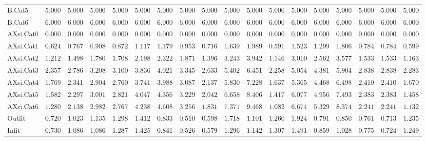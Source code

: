 \documentclass[6pt]{article}
\begin{document}
{\begin{longtable}{lrrrrrrrrrrrrrrrrr}
B.Cat5&$ 5.000$&$ 5.000$&$ 5.000$&$ 5.000$&$ 5.000$&$ 5.000$&$ 5.000$&$ 5.000$&$ 5.000$&$ 5.000$&$ 5.000$&$ 5.000$&$ 5.000$&$ 5.000$&$ 5.000$&$ 5.000$&$ 5.000$\tabularnewline
B.Cat6&$ 6.000$&$ 6.000$&$ 6.000$&$ 6.000$&$ 6.000$&$ 6.000$&$ 6.000$&$ 6.000$&$ 6.000$&$ 6.000$&$ 6.000$&$ 6.000$&$ 6.000$&$ 6.000$&$ 6.000$&$ 6.000$&$ 6.000$\tabularnewline
AXsi.Cat0&$ 0.000$&$ 0.000$&$ 0.000$&$ 0.000$&$ 0.000$&$ 0.000$&$ 0.000$&$ 0.000$&$ 0.000$&$ 0.000$&$ 0.000$&$ 0.000$&$ 0.000$&$ 0.000$&$ 0.000$&$ 0.000$&$ 0.000$\tabularnewline
AXsi.Cat1&$ 0.624$&$ 0.767$&$ 0.908$&$ 0.872$&$ 1.117$&$ 1.179$&$ 0.953$&$ 0.716$&$ 1.639$&$ 1.989$&$ 0.591$&$ 1.523$&$ 1.299$&$ 1.806$&$ 0.784$&$ 0.784$&$ 0.599$\tabularnewline
AXsi.Cat2&$ 1.212$&$ 1.498$&$ 1.780$&$ 1.708$&$ 2.198$&$ 2.322$&$ 1.871$&$ 1.396$&$ 3.243$&$ 3.942$&$ 1.146$&$ 3.010$&$ 2.562$&$ 3.577$&$ 1.533$&$ 1.533$&$ 1.163$\tabularnewline
AXsi.Cat3&$ 2.357$&$ 2.786$&$ 3.208$&$ 3.100$&$ 3.836$&$ 4.021$&$ 3.345$&$ 2.633$&$ 5.402$&$ 6.451$&$ 2.258$&$ 5.054$&$ 4.381$&$ 5.904$&$ 2.838$&$ 2.838$&$ 2.283$\tabularnewline
AXsi.Cat4&$ 1.769$&$ 2.341$&$ 2.904$&$ 2.760$&$ 3.741$&$ 3.988$&$ 3.087$&$ 2.137$&$ 5.830$&$ 7.228$&$ 1.637$&$ 5.365$&$ 4.468$&$ 6.498$&$ 2.410$&$ 2.410$&$ 1.670$\tabularnewline
AXsi.Cat5&$ 1.582$&$ 2.297$&$ 3.001$&$ 2.821$&$ 4.047$&$ 4.356$&$ 3.229$&$ 2.042$&$ 6.658$&$ 8.406$&$ 1.417$&$ 6.077$&$ 4.956$&$ 7.493$&$ 2.383$&$ 2.383$&$ 1.458$\tabularnewline
AXsi.Cat6&$ 1.280$&$ 2.138$&$ 2.982$&$ 2.767$&$ 4.238$&$ 4.608$&$ 3.256$&$ 1.831$&$ 7.371$&$ 9.468$&$ 1.082$&$ 6.674$&$ 5.329$&$ 8.374$&$ 2.241$&$ 2.241$&$ 1.132$\tabularnewline
Outfit&$ 0.720$&$ 1.023$&$ 1.135$&$ 1.298$&$ 1.412$&$ 0.833$&$ 0.510$&$ 0.598$&$ 1.718$&$ 1.101$&$ 1.260$&$ 1.924$&$ 0.791$&$ 0.850$&$ 0.761$&$ 0.713$&$ 1.235$\tabularnewline
Infit&$ 0.730$&$ 1.086$&$ 1.086$&$ 1.287$&$ 1.425$&$ 0.841$&$ 0.526$&$ 0.579$&$ 1.296$&$ 1.142$&$ 1.307$&$ 1.491$&$ 0.859$&$ 1.028$&$ 0.775$&$ 0.724$&$ 1.249$\tabularnewline
\hline
\end{longtable}}
\end{document}
